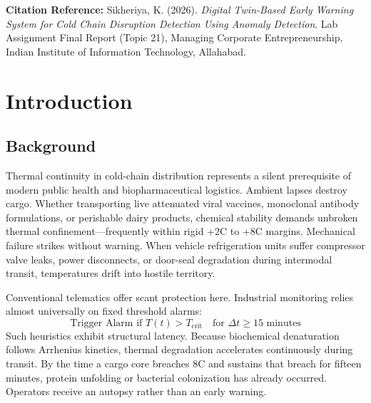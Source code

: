 \documentclass[11pt,a4paper,oneside]{report}
\begin{document}
\vspace{0.3cm}
{\small\textbf{Citation Reference:} Sikheriya, K. (2026). \textit{Digital Twin-Based Early Warning System for Cold Chain Disruption Detection Using Anomaly Detection}. Lab Assignment Final Report (Topic 21), Managing Corporate Entrepreneurship, Indian Institute of Information Technology, Allahabad.}

\clearpage
\tableofcontents
\clearpage
\listoffigures
\clearpage
\listoftables

\clearpage
{}

\chapter{Introduction}
\label{chap:introduction}

\section{Background}
\label{sec:background}

Thermal continuity in cold-chain distribution represents a silent prerequisite of modern public health and biopharmaceutical logistics. Ambient lapses destroy cargo. Whether transporting live attenuated viral vaccines, monoclonal antibody formulations, or perishable dairy products, chemical stability demands unbroken thermal confinement---frequently within rigid +2\textdegree{}C to +8\textdegree{}C margins. Mechanical failure strikes without warning. When vehicle refrigeration units suffer compressor valve leaks, power disconnects, or door-seal degradation during intermodal transit, temperatures drift into hostile territory. 

Conventional telematics offer scant protection here. Industrial monitoring relies almost universally on fixed threshold alarms:
\begin{equation}
\text{Trigger Alarm if } T(t) > T_{\text{crit}} \quad \text{for } \Delta t \ge 15\text{ minutes}
\label{eq:reactive_alarm}
\end{equation}
Such heuristics exhibit structural latency. Because biochemical denaturation follows Arrhenius kinetics, thermal degradation accelerates continuously during transit. By the time a cargo core breaches 8\textdegree{}C and sustains that breach for fifteen minutes, protein unfolding or bacterial colonization has already occurred. Operators receive an autopsy rather than an early warning.
\end{document}

